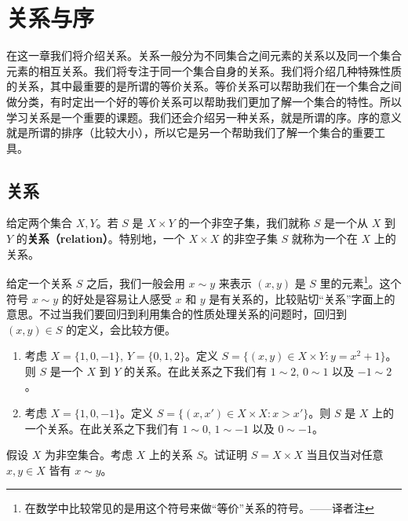 

\chapter{关系与序}

在这一章我们将介绍关系。关系一般分为不同集合之间元素的关系以及同一个集合元素的相互关系。我们将专注于同一个集合自身的关系。我们将介绍几种特殊性质的关系，其中最重要的是所谓的等价关系。等价关系可以帮助我们在一个集合之间做分类，有时定出一个好的等价关系可以帮助我们更加了解一个集合的特性。所以学习关系是一个重要的课题。我们还会介绍另一种关系，就是所谓的序。序的意义就是所谓的排序（比较大小），所以它是另一个帮助我们了解一个集合的重要工具。

\section{关系}

给定两个集合 $X, Y$。若 $S$ 是 $X \times Y$ 的一个非空子集，我们就称 $S$ 是一个从 $X$ 到 $Y$ 的\textbf{关系（relation）}。特别地，一个 $X \times X$ 的非空子集 $S$ 就称为一个在 $X$ 上的关系。

给定一个关系 $S$ 之后，我们一般会用 $x \sim y$ 来表示 $(x, y)$ 是 $S$ 里的元素\footnote{在数学中比较常见的是用这个符号来做“等价”关系的符号。——译者注}。这个符号 $x \sim y$ 的好处是容易让人感受 $x$ 和 $y$ 是有关系的，比较贴切“关系”字面上的意思。不过当我们要回归到利用集合的性质处理关系的问题时，回归到 $(x, y) \in S$ 的定义，会比较方便。

\begin{example}
\begin{enumerate}
    \item 考虑 $X = \{1, 0, -1\}$, $Y = \{0, 1, 2\}$。定义 $S = \{(x, y) \in X \times Y : y = x^2 + 1\}$。则 $S$ 是一个 $X$ 到 $Y$ 的关系。在此关系之下我们有 $1 \sim 2$, $0 \sim 1$ 以及 $-1 \sim 2$。
    \item 考虑 $X = \{1, 0, -1\}$。定义 $S = \{(x, x') \in X \times X : x > x'\}$。则 $S$ 是 $X$ 上的一个关系。在此关系之下我们有 $1 \sim 0$, $1 \sim -1$ 以及 $0 \sim -1$。
\end{enumerate}
\end{example}

\begin{question}
假设 $X$ 为非空集合。考虑 $X$ 上的关系 $S$。试证明 $S = X \times X$ 当且仅当对任意 $x, y \in X$ 皆有 $x \sim y$。
\end{question}

